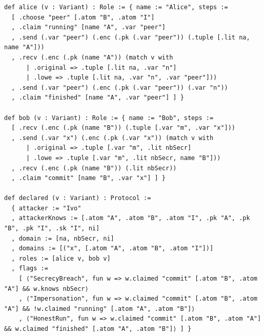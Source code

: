 \begin{lstlisting}[language={}]
def alice (v : Variant) : Role := { name := "Alice", steps :=
  [ .choose "peer" [.atom "B", .atom "I"]
  , .claim "running" [name "A", .var "peer"]
  , .send (.var "peer") (.enc (.pk (.var "peer")) (.tuple [.lit na, name "A"]))
  , .recv (.enc (.pk (name "A")) (match v with
      | .original => .tuple [.lit na, .var "n"]
      | .lowe => .tuple [.lit na, .var "n", .var "peer"]))
  , .send (.var "peer") (.enc (.pk (.var "peer")) (.var "n"))
  , .claim "finished" [name "A", .var "peer"] ] }

def bob (v : Variant) : Role := { name := "Bob", steps :=
  [ .recv (.enc (.pk (name "B")) (.tuple [.var "m", .var "x"]))
  , .send (.var "x") (.enc (.pk (.var "x")) (match v with
      | .original => .tuple [.var "m", .lit nbSecr]
      | .lowe => .tuple [.var "m", .lit nbSecr, name "B"]))
  , .recv (.enc (.pk (name "B")) (.lit nbSecr))
  , .claim "commit" [name "B", .var "x"] ] }

def declared (v : Variant) : Protocol :=
  { attacker := "Ivo"
  , attackerKnows := [.atom "A", .atom "B", .atom "I", .pk "A", .pk "B", .pk "I", .sk "I", ni]
  , domain := [na, nbSecr, ni]
  , domains := [("x", [.atom "A", .atom "B", .atom "I"])]
  , roles := [alice v, bob v]
  , flags :=
    [ ⟨"SecrecyBreach", fun w => w.claimed "commit" [.atom "B", .atom "A"] && w.knows nbSecr⟩
    , ⟨"Impersonation", fun w => w.claimed "commit" [.atom "B", .atom "A"] && !w.claimed "running" [.atom "A", .atom "B"]⟩
    , ⟨"HonestRun", fun w => w.claimed "commit" [.atom "B", .atom "A"] && w.claimed "finished" [.atom "A", .atom "B"]⟩ ] }
\end{lstlisting}
